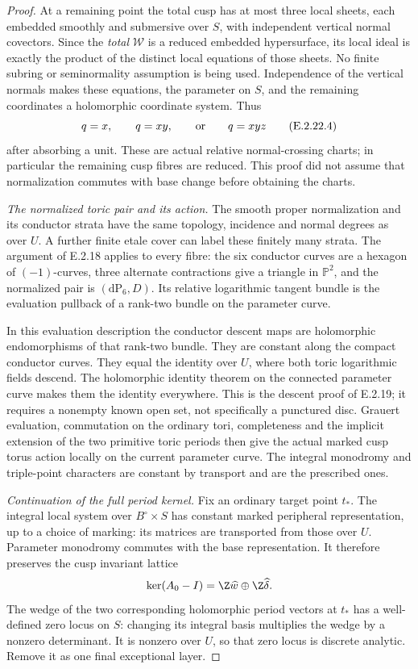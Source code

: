 \begin{proof}
At a remaining point the total cusp
has at most three local sheets, each
embedded smoothly and submersive over
$S$, with independent vertical normal
covectors.  Since the \emph{total}
$\mathcal W$ is a reduced embedded
hypersurface, its local ideal is exactly
the product of the distinct local
equations of those sheets.  No finite
subring or seminormality assumption
is being used.  Independence of the
vertical normals makes these equations,
the parameter on $S$, and the remaining
coordinates a holomorphic coordinate
system.  Thus
\[
 q=x,\qquad q=xy,\qquad\hbox{or}\qquad q=xyz
 \tag{E.2.22.4}
\]
after absorbing a unit.  These are
actual relative normal-crossing charts;
in particular the remaining cusp fibres
are reduced.  This proof did not assume
that normalization commutes with base
change before obtaining the charts.

\emph{The normalized toric pair and its action.}
The smooth proper normalization and
its conductor strata have the same
topology, incidence and normal degrees
as over $U$.  A further finite etale
cover can label these finitely many
strata.  The argument of E.2.18 applies
to every fibre: the six conductor
curves are a hexagon of $(-1)$-curves,
three alternate contractions give a
triangle in $\mathbb P^2$, and the
normalized pair is $(\mathrm{dP}_6,D)$.
Its relative logarithmic tangent bundle
is the evaluation pullback of a rank-two
bundle on the parameter curve.

In this evaluation description the
conductor descent maps are holomorphic
endomorphisms of that rank-two bundle.
They are constant along the compact
conductor curves.  They equal the identity
over $U$, where both toric logarithmic
fields descend.  The holomorphic identity
theorem on the connected parameter curve
makes them the identity everywhere.
This is the descent proof of E.2.19;
it requires a nonempty known open set,
not specifically a punctured disc.
Grauert evaluation, commutation on the
ordinary tori, completeness and the
implicit extension of the two primitive
toric periods then give the actual
marked cusp torus action locally on
the current parameter curve.  The
integral monodromy and triple-point
characters are constant by transport
and are the prescribed ones.

\emph{Continuation of the full period kernel.}
Fix an ordinary target point $t_*$.
The integral local system over
$B^\circ\times S$ has constant marked
peripheral representation, up to a
choice of marking: its matrices are
transported from those over $U$.
Parameter monodromy commutes with the
base representation.  It therefore
preserves the cusp invariant lattice
\[
 \ker(A_0-I)=\Z\widehat w\oplus\Z\widehat\delta.
\]
The wedge of the two corresponding
holomorphic period vectors at $t_*$
has a well-defined zero locus on $S$:
changing its integral basis multiplies
the wedge by a nonzero determinant.
It is nonzero over $U$, so that zero
locus is discrete analytic.  Remove
it as one final exceptional layer.


\end{proof}
